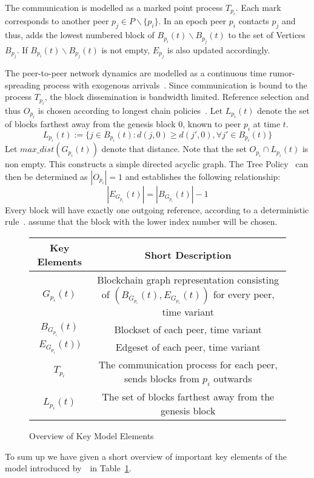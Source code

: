 The communication is modelled as a marked point process $T_{p_i}$.
Each mark corresponds to another peer $p_j \in P\backslash \{p_i\}$.
In an epoch peer $p_i$ contacts $p_j$ and thus, adds the lowest numbered block of $B_{p_i}(t)\backslash B_{p_j}(t)$ to the set of Vertices $B_{p_j}$. If $B_{p_i}(t)\backslash B_{p_j}(t)$ is not empty, $E_{p_j}$ is also updated accordingly.

The peer-to-peer network dynamics are modelled as a continuous time rumor-spreading process with exogenous arrivals~\citep{gopalan}. Since communication is bound to the process $T_{p_i}$, the block dissemination is bandwidth limited.
Reference selection and thus $O_{p_i}$ is chosen according to longest chain policies~\citep{gopalan}.
Let $L_{p_i}(t)$ denote the set of blocks farthest away from the genesis block $0$, known to peer $p_i$ at time $t$.
\begin{equation}
L_{p_i}(t) := \{j \in B_{p_i}(t): d(j,0)\geq d(j',0), \forall j' \in B_{p_i}(t) \}
\label{policy}
\end{equation}
Let $max\_ dist(G_{p_i}(t))$ denote that distance.
Note that the set $O_{p_i} \cap L_{p_i}(t)$ is non empty. This constructs a simple directed acyclic graph. The Tree Policy~\citep{gopalan} can then be determined as $|O_{p_i}|=1$ and establishes the following relationship:
\begin{equation}
|E_{G_{p_i}}(t)| = |B_{G_{p_i}}(t)| -1
\end{equation}
Every block will have exactly one outgoing reference, according to a deterministic rule~\citep{gopalan}. \citeauthor{gopalan} assume that the block with the lower index number will be chosen.

\begin{figure}[t]
\centering
{\renewcommand{\arraystretch}{1.5}
	\begin{tabular}{|c|c|}
	\hline
	\textbf{Key Elements}		&\textbf{Short Description}\\
	\hline
	$G_{p_i}(t)$				& \footnotesize Blockchain graph representation consisting of $(B_{G_{p_i}}(t),E_{G_{p_i}}(t))$ for every peer, time variant\\
	$B_{G_{p_i}}(t)$			& \footnotesize Blockset of each peer, time variant\\
	$E_{G_{p_i}}(t))$			& \footnotesize Edgeset of each peer, time variant \\
	$T_{p_i}$					& \footnotesize The communication process for each peer, sends blocks from $p_i$ outwards\\
	$L_{p_i}(t)$				& \footnotesize The set of blocks farthest away from the genesis block\\
	\hline
	\end{tabular}
}
\caption{Overview of Key Model Elements}
\label{OverviewElements}
\end{figure}
To sum up we have given a short overview of important key elements of the model introduced by~~in Table~\ref{OverviewElements}.

